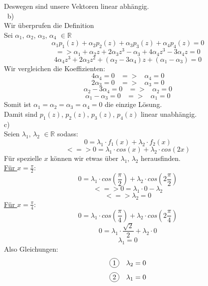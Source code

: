 \documentclass[11pt]{article}
\newcommand*\circled[1]{\tikz[baseline=(char.base)]{
            \node[shape=circle,draw,inner sep=2pt] (char) {#1};}}
\begin{document}
				Deswegen sind unsere Vektoren linear abhängig.\\\
			\indent b)\\
					Wir überprufen die Definition\\
					Sei $\alpha_1$, $\alpha_2$, $\alpha_3$, $\alpha_4$ $\in \mathbb{R}$\\
					$$\alpha_1 p_1(z)+\alpha_2 p_2(z)+\alpha_3 p_3(z)+\alpha_4 p_4(z)=0$$
					$$=>\alpha_1+\alpha_2z+2\alpha_3z^3-\alpha_3+4\alpha_4z^3-3\alpha_4z=0$$
					$$4\alpha_4z^3+2\alpha_3z^2+(\alpha_2-3\alpha_4)z+(\alpha_1-\alpha_3)=0$$
					Wir vergleichen die Koeffizienten:
					$$4\alpha_4=0 \hspace{10pt} => \hspace{10pt} \alpha_4=0$$
					$$2\alpha_3=0 \hspace{10pt} => \hspace{10pt} \alpha_3=0$$
					$$\alpha_2-3\alpha_4=0 \hspace{10pt} => \hspace{10pt} \alpha_2=0$$
					$$\alpha_1-\alpha_3=0 \hspace{10pt} => \hspace{10pt} \alpha_1=0$$
					Somit ist $\alpha_1=\alpha_2=\alpha_3=\alpha_4=0$ die einzige Lösung.\\
					Damit sind $p_1(z)$, $p_2(z)$, $p_3(z)$, $p_4(z)$ linear unabhängig.\\
				\indent c)\\
					Seien $\lambda_1$, $\lambda_2$ $\in \mathbb{R}$ sodass:\\
					$$0=\lambda_1 \cdot f_1(x)+\lambda_2 \cdot f_2(x)$$
					$$<=>0=\lambda_1 \cdot cos(x)+\lambda_2 \cdot cos(2x)$$
					Für spezielle $x$ können wir etwas über $\lambda_1$, $\lambda_2$ herausfinden.\\
					\underline{Für $x=\frac{\pi}{2}$}:\\
					$$0=\lambda_1 \cdot cos \left(\frac{\pi}{2}\right)+\lambda_2 \cdot cos\left(2\frac{\pi}{2}\right)$$
					$$<=>0=\lambda_1 \cdot 0 - \lambda_2$$
					$$<=>\lambda_2=0$$
					\underline{Für $x=\frac{\pi}{4}$}:\\
					$$0=\lambda_1 \cdot cos \left(\frac{\pi}{4}\right)+\lambda_2 \cdot cos\left(2\frac{\pi}{4}\right)$$
					$$0=\lambda_1 \cdot \frac{\sqrt{2}}{2}+\lambda_2 \cdot 0$$
					$$\lambda_1=0$$
					Also Gleichungen:\\
					$$\circled{1} \hspace{10pt} \lambda_2=0$$
					$$\circled{2} \hspace{10pt} \lambda_1=0$$
\end{document}
